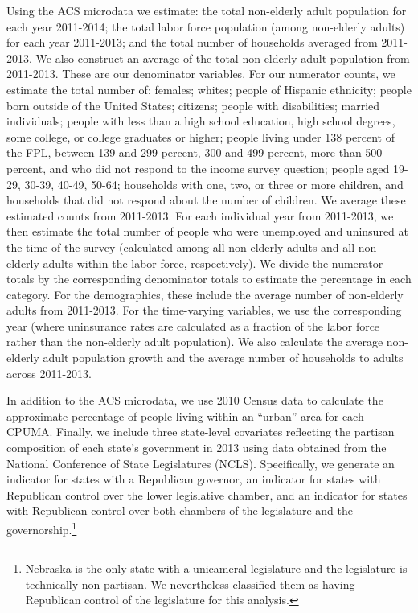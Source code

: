 \documentclass[aoas]{imsart}
\theoremstyle{plain}
\theoremstyle{remark}
\begin{document}
Using the ACS microdata we estimate: the total non-elderly adult population for each year 2011-2014; the total labor force population (among non-elderly adults) for each year 2011-2013; and the total number of households averaged from 2011-2013. We also construct an average of the total non-elderly adult population from 2011-2013. These are our denominator variables. For our numerator counts, we estimate the total number of: females; whites; people of Hispanic ethnicity; people born outside of the United States; citizens; people with disabilities; married individuals; people with less than a high school education, high school degrees, some college, or college graduates or higher; people living under 138 percent of the FPL, between 139 and 299 percent, 300 and 499 percent, more than 500 percent, and who did not respond to the income survey question; people aged 19-29, 30-39, 40-49, 50-64; households with one, two, or three or more children, and households that did not respond about the number of children. We average these estimated counts from 2011-2013. For each individual year from 2011-2013, we then estimate the total number of people who were unemployed and uninsured at the time of the survey (calculated among all non-elderly adults and all non-elderly adults within the labor force, respectively). We divide the numerator totals by the corresponding denominator totals to estimate the percentage in each category. For the demographics, these include the average number of non-elderly adults from 2011-2013. For the time-varying variables, we use the corresponding year (where uninsurance rates are calculated as a fraction of the labor force rather than the non-elderly adult population). We also calculate the average non-elderly adult population growth and the average number of households to adults across 2011-2013. 

In addition to the ACS microdata, we use 2010 Census data to calculate the approximate percentage of people living within an ``urban'' area for each CPUMA. Finally, we include three state-level covariates reflecting the partisan composition of each state's government in 2013 using data obtained from the National Conference of State Legislatures (NCLS). Specifically, we generate an indicator for states with a Republican governor, an indicator for states with Republican control over the lower legislative chamber, and an indicator for states with Republican control over both chambers of the legislature and the governorship.\footnote{Nebraska is the only state with a unicameral legislature and the legislature is technically non-partisan. We nevertheless classified them as having Republican control of the legislature for this analysis.} 
\end{document}
